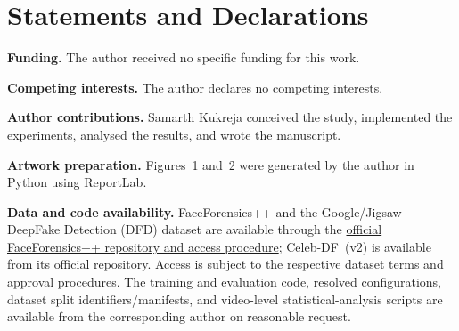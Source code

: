 \documentclass[pdflatex,sn-mathphys-num,iicol]{sn-jnl}
\begin{document}
\section*{Statements and Declarations}
\textbf{Funding.} The author received no specific funding for this work.

\textbf{Competing interests.} The author declares no competing interests.

\textbf{Author contributions.} Samarth Kukreja conceived the study, implemented the experiments, analysed the results, and wrote the manuscript.

\textbf{Artwork preparation.} Figures~1 and~2 were generated by the author in Python using ReportLab.

\textbf{Data and code availability.} FaceForensics++ and the Google/Jigsaw DeepFake Detection (DFD) dataset are available through the \href{https://github.com/ondyari/FaceForensics}{official FaceForensics++ repository and access procedure}; Celeb-DF~(v2) is available from its \href{https://github.com/yuezunli/celeb-deepfakeforensics}{official repository}. Access is subject to the respective dataset terms and approval procedures. The training and evaluation code, resolved configurations, dataset split identifiers/manifests, and video-level statistical-analysis scripts are available from the corresponding author on reasonable request.

\FloatBarrier
\end{document}
